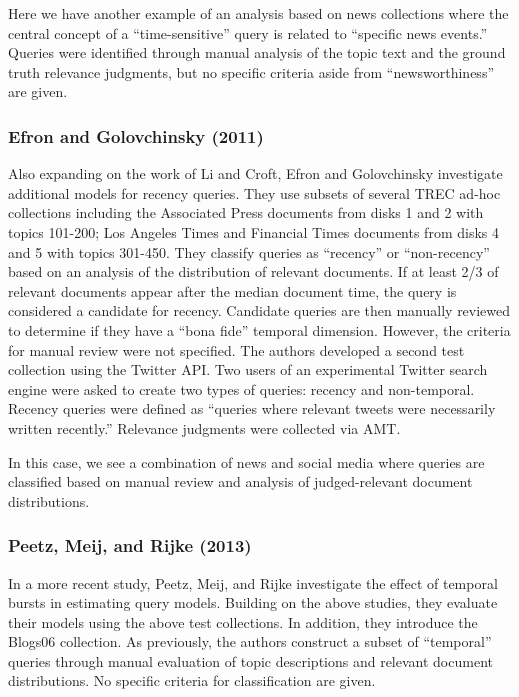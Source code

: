 \documentclass{sig-alternate}
\begin{document}
Here we have another example of an analysis based on news collections where the central concept of a ``time-sensitive'' query is related to ``specific news events.'' Queries were identified through manual analysis of the topic text and the ground truth relevance judgments, but no specific criteria aside from ``newsworthiness'' are given.

\subsubsection{Efron and Golovchinsky (2011)}
Also expanding on the work of Li and Croft, Efron and Golovchinsky \cite{Efron2011} investigate additional models for recency queries. They use subsets of several TREC ad-hoc collections including the Associated Press documents from disks 1 and 2 with topics 101-200; Los Angeles Times and Financial Times documents from disks 4 and 5 with topics 301-450. They classify queries as ``recency'' or ``non-recency'' based on an analysis of the distribution of relevant documents. If at least 2/3 of relevant documents appear after the median document time, the query is considered a candidate for recency. Candidate queries are then manually reviewed to determine if they have a ``bona fide'' temporal dimension. However, the criteria for manual review were not specified.  The authors developed a second test collection using the Twitter API. Two users of an experimental Twitter search engine were asked to create two types of queries: recency and non-temporal. Recency queries were defined as ``queries where relevant tweets were necessarily written recently.''  Relevance judgments were collected via AMT. 

In this case, we see a combination of news and social media where queries are classified based on manual review and analysis of judged-relevant document distributions.

\subsubsection{Peetz, Meij, and Rijke (2013)}

In a more recent study, Peetz, Meij, and Rijke \cite{Peetz2013} investigate the effect of temporal bursts in estimating query models. Building on the above studies, they evaluate their models using the above test collections. In addition, they introduce the Blogs06 collection. As previously, the authors construct a subset of ``temporal'' queries through manual evaluation of topic descriptions and relevant document distributions. No specific criteria for classification are given.
\end{document}
